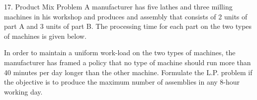 \begin{frameExample}{17. Product Mix Problem}{}
  A manufacturer has five lathes and three milling machines in his workshop and produces and assembly that consists of 2 units of part A and 3 units of part B. The processing time for each part on the two types of machines is given below.

  {
    \centering
    \par
  }

  In order to maintain a uniform work-load on the two types of machines, the manufacturer has framed a policy that no type of machine should run more than 40 minutes per day longer than the other machine. Formulate the L.P. problem if the objective is to produce the maximum number of assemblies in any 8-hour working day.
\end{frameExample}


